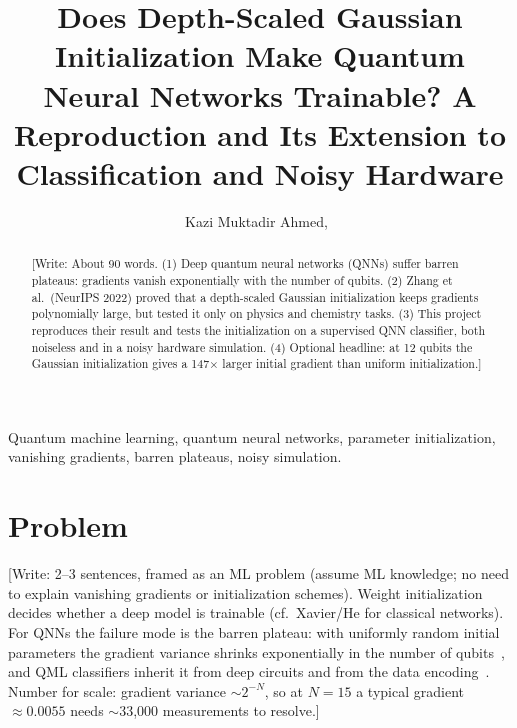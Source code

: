 \documentclass[lettersize,journal]{IEEEtran}
\newcommand{\todo}[1]{{\color{red}[Write: #1]}}
\begin{document}
\title{Does Depth-Scaled Gaussian Initialization Make Quantum Neural Networks Trainable? A Reproduction and Its Extension to Classification and Noisy Hardware}

\author{
    Kazi Muktadir Ahmed,~%
}

\maketitle

\begin{abstract}
\todo{About 90 words. (1) Deep quantum neural networks (QNNs) suffer barren plateaus: gradients vanish exponentially with the number of qubits. (2) Zhang et al.\ (NeurIPS 2022) proved that a depth-scaled Gaussian initialization keeps gradients polynomially large, but tested it only on physics and chemistry tasks. (3) This project reproduces their result and tests the initialization on a supervised QNN classifier, both noiseless and in a noisy hardware simulation. (4) Optional headline: at 12 qubits the Gaussian initialization gives a 147$\times$ larger initial gradient than uniform initialization.}
\end{abstract}

\begin{IEEEkeywords}
Quantum machine learning, quantum neural networks, parameter initialization, vanishing gradients, barren plateaus, noisy simulation.
\end{IEEEkeywords}

\section{Problem}
\todo{2--3 sentences, framed as an ML problem (assume ML knowledge; no need to explain vanishing gradients or initialization schemes). Weight initialization decides whether a deep model is trainable (cf.\ Xavier/He for classical networks). For QNNs the failure mode is the barren plateau: with uniformly random initial parameters the gradient variance shrinks exponentially in the number of qubits~\cite{mcclean2018barren}, and QML classifiers inherit it from deep circuits and from the data encoding~\cite{thanasilp2023subtleties}. Number for scale: gradient variance $\sim2^{-N}$, so at $N=15$ a typical gradient $\approx0.0055$ needs $\sim$33{,}000 measurements to resolve.}
\end{document}
